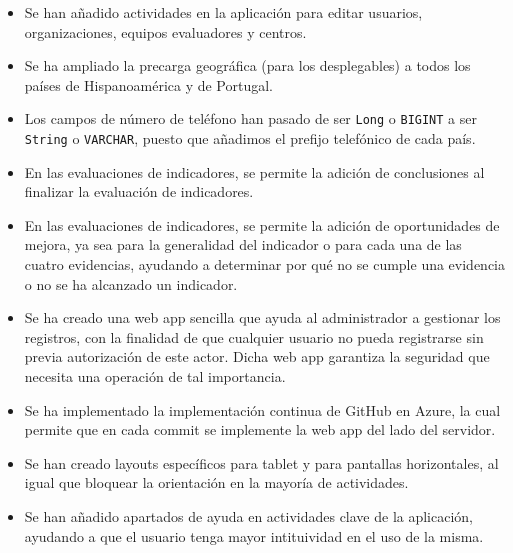 \begin{itemize}
\begin{lstlisting}
    \end{lstlisting}
    \item Se han añadido actividades en la aplicación para editar usuarios, organizaciones, equipos evaluadores y centros.
    \item Se ha ampliado la precarga geográfica (para los desplegables) a todos los países de Hispanoamérica y de Portugal.
    \item Los campos de número de teléfono han pasado de ser \texttt{Long} o
    \texttt{BIGINT} a ser \texttt{String} o \texttt{VARCHAR}, puesto que añadimos el prefijo telefónico de cada país.
    \item En las evaluaciones de indicadores, se permite la adición de conclusiones al finalizar la evaluación de indicadores.
    \item En las evaluaciones de indicadores, se permite la adición de
    oportunidades de mejora, ya sea para la generalidad del indicador o para
    cada una de las cuatro evidencias, ayudando a determinar por qué no se
    cumple una evidencia o no se ha alcanzado un indicador.
    \item Se ha creado una web app sencilla que ayuda al administrador a
    gestionar los registros, con la finalidad de que cualquier usuario no pueda
    registrarse sin previa autorización de este actor. Dicha web
    app\cite{guiaoteaadminHerramientaAdministracixF3n} garantiza la seguridad
    que necesita una operación de tal importancia.
    \item Se ha implementado la implementación continua de GitHub en Azure, la
    cual permite que en cada commit se implemente la web app del lado del
    servidor.
    \item Se han creado layouts específicos para tablet y para pantallas
    horizontales, al igual que bloquear la orientación en la mayoría de
    actividades.
    \item Se han añadido apartados de ayuda en actividades clave de la
    aplicación, ayudando a que el usuario tenga mayor intituividad en el uso de
    la misma.
\end{itemize}

